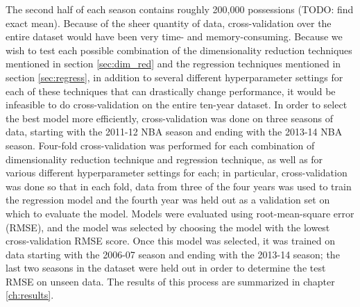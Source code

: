 The second half of each season contains roughly 200,000 possessions (TODO: find
exact mean). Because of the sheer quantity of data, cross-validation over the entire
dataset would have been very time- and memory-consuming. Because we wish to test
each possible combination of the dimensionality reduction techniques mentioned in
section \ref{sec:dim_red} and the regression techniques mentioned in section
\ref{sec:regress}, in addition to several different hyperparameter settings for each
of these techniques that can drastically change performance, it would be infeasible
to do cross-validation on the entire ten-year dataset. In order to select the best
model more efficiently, cross-validation was done on three seasons of data, starting
with the 2011-12 NBA season and ending with the 2013-14 NBA season.  Four-fold
cross-validation was performed for each combination of dimensionality reduction
technique and regression technique, as well as for various different hyperparameter
settings for each; in particular, cross-validation was done so that in each fold,
data from three of the four years was used to train the regression model and the
fourth year was held out as a validation set on which to evaluate the model. Models
were evaluated using root-mean-square error (RMSE), and the model was selected by
choosing the model with the lowest cross-validation RMSE score. Once this model was
selected, it was trained on data starting with the 2006-07 season and ending with
the 2013-14 season; the last two seasons in the dataset were held out in order to
determine the test RMSE on unseen data. The results of this process are summarized
in chapter \ref{ch:results}.
